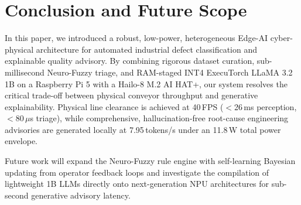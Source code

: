 \documentclass[conference]{IEEEtran}
\begin{document}
\section{Conclusion and Future Scope}
In this paper, we introduced a robust, low-power, heterogeneous Edge-AI cyber-physical architecture for automated industrial defect classification and explainable quality advisory. By combining rigorous dataset curation, sub-millisecond Neuro-Fuzzy triage, and RAM-staged INT4 ExecuTorch LLaMA 3.2 1B on a Raspberry Pi 5 with a Hailo-8 M.2 AI HAT+, our system resolves the critical trade-off between physical conveyor throughput and generative explainability. Physical line clearance is achieved at 40\,FPS ($<$26\,ms perception, $<80\,\mu$s triage), while comprehensive, hallucination-free root-cause engineering advisories are generated locally at 7.95\,tokens/s under an 11.8\,W total power envelope. 

Future work will expand the Neuro-Fuzzy rule engine with self-learning Bayesian updating from operator feedback loops and investigate the compilation of lightweight 1B LLMs directly onto next-generation NPU architectures for sub-second generative advisory latency.
\end{document}
